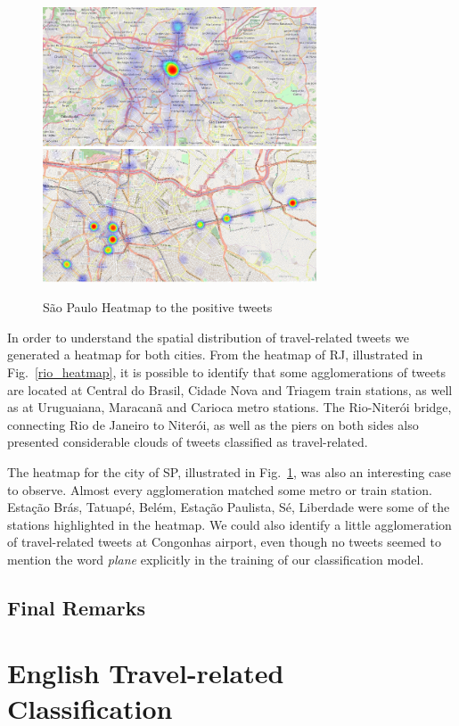 \begin{figure}[h]
  \caption{São Paulo Heatmap to the positive tweets}
  \centering
    \includegraphics[width=0.725\textwidth]{figures/sp_1}
    \label{sp_heatmap}
\end{figure}

In order to understand the spatial distribution of travel-related tweets we generated a heatmap for both cities. From the heatmap of RJ, illustrated in Fig.~\ref{rio_heatmap}, it is possible to identify that some agglomerations of tweets are located at Central do Brasil, Cidade Nova and Triagem train stations, as well as at Uruguaiana, Maracanã and Carioca metro stations. The Rio-Niterói bridge, connecting Rio de Janeiro to Niterói, as well as the piers on both sides also presented considerable clouds of tweets classified as travel-related.

The heatmap for the city of SP, illustrated in Fig.~\ref{sp_heatmap}, was also an interesting case to observe. Almost every agglomeration matched some metro or train station. Estação Brás, Tatuapé, Belém, Estação Paulista, Sé, Liberdade were some of the stations highlighted in the heatmap. We could also identify a little agglomeration of travel-related tweets at Congonhas airport, even though no tweets seemed to mention the word \textit{plane} explicitly in the training of our classification model.

\subsection{Final Remarks}

\section{English Travel-related Classification}

